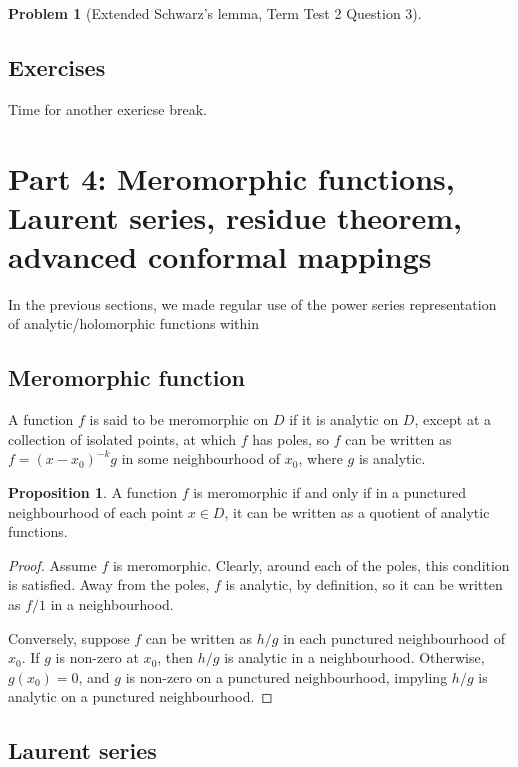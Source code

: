 \documentclass[aps,pra,showpacs,notitlepage,onecolumn,superscriptaddress,nofootinbib]{revtex4-1}
\theoremstyle{definition}
\newtheorem{prop}{Proposition}[section]
\newtheorem{problem}{Problem}[section]
\begin{document}
\begin{problem}[Extended Schwarz's lemma, Term Test 2 Question 3]

  \end{problem}

\subsection{Exercises}

\noindent Time for another exericse break.

\section{Part 4: Meromorphic functions, Laurent series, residue theorem, advanced conformal mappings}

\noindent In the previous sections, we made regular use of the power series representation of analytic/holomorphic functions within

\subsection{Meromorphic function}

\noindent A function $f$ is said to be meromorphic on $D$ if it is analytic on $D$, except at a collection of isolated points, at which
$f$ has poles, so $f$ can be written as $f = (x - x_0)^{-k} g$ in some neighbourhood of $x_0$, where $g$ is analytic.

\begin{prop}
  A function $f$ is meromorphic if and only if in a punctured neighbourhood of each point $x \in D$, it can be written as a quotient
  of analytic functions.
\end{prop}
\begin{proof}
  Assume $f$ is meromorphic. Clearly, around each of the poles, this condition is satisfied. Away from the poles, $f$ is analytic, by definition,
  so it can be written as $f/1$ in a neighbourhood.

  Conversely, suppose $f$ can be written as $h/g$ in each punctured neighbourhood of $x_0$. If $g$ is non-zero at $x_0$, then $h/g$ is analytic
  in a neighbourhood. Otherwise, $g(x_0) = 0$, and $g$ is non-zero on a punctured neighbourhood, impyling $h/g$ is analytic on a punctured neighbourhood.
\end{proof}

\subsection{Laurent series}
\end{document}
